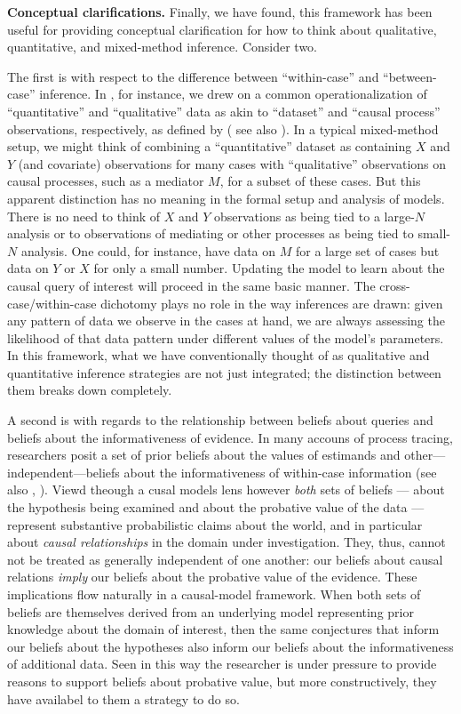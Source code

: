\documentclass[
  12pt,
]{book}
\begin{document}
\textbf{Conceptual clarifications.} Finally, we have found, this framework has been useful for providing conceptual clarification for how to think about qualitative, quantitative, and mixed-method inference. Consider two.

The first is with respect to the difference between ``within-case'' and ``between-case'' inference. In \citet{humphreys2015mixing}, for instance, we drew on a common operationalization of ``quantitative'' and ``qualitative'' data as akin to ``dataset'' and ``causal process'' observations, respectively, as defined by \citet{collier2010sources} ( see also \citet{mahoney2000strategies}). In a typical mixed-method setup, we might think of combining a ``quantitative'' dataset as containing \(X\) and \(Y\) (and covariate) observations for many cases with ``qualitative'' observations on causal processes, such as a mediator \(M\), for a subset of these cases. But this apparent distinction has no meaning in the formal setup and analysis of models. There is no need to think of \(X\) and \(Y\) observations as being tied to a large-\(N\) analysis or to observations of mediating or other processes as being tied to small-\(N\) analysis. One could, for instance, have data on \(M\) for a large set of cases but data on \(Y\) or \(X\) for only a small number. Updating the model to learn about the causal query of interest will proceed in the same basic manner. The cross-case/within-case dichotomy plays no role in the way inferences are drawn: given any pattern of data we observe in the cases at hand, we are always assessing the likelihood of that data pattern under different values of the model's parameters. In this framework, what we have conventionally thought of as qualitative and quantitative inference strategies are not just integrated; the distinction between them breaks down completely.

A second is with regards to the relationship between beliefs about queries and beliefs about the informativeness of evidence. In many accouns of process tracing, researchers posit a set of prior beliefs about the values of estimands and other---independent---beliefs about the informativeness of within-case information (see also \citet{FairfieldBayes2015}, \citet{BennettAppendix}). Viewd theough a cusal models lens however \emph{both} sets of beliefs --- about the hypothesis being examined and about the probative value of the data --- represent substantive probabilistic claims about the world, and in particular about \emph{causal relationships} in the domain under investigation. They, thus, cannot not be treated as generally independent of one another: our beliefs about causal relations \emph{imply} our beliefs about the probative value of the evidence. These implications flow naturally in a causal-model framework. When both sets of beliefs are themselves derived from an underlying model representing prior knowledge about the domain of interest, then the same conjectures that inform our beliefs about the hypotheses also inform our beliefs about the informativeness of additional data. Seen in this way the researcher is under pressure to provide reasons to support beliefs about probative value, but more constructively, they have availabel to them a strategy to do so.
\end{document}
